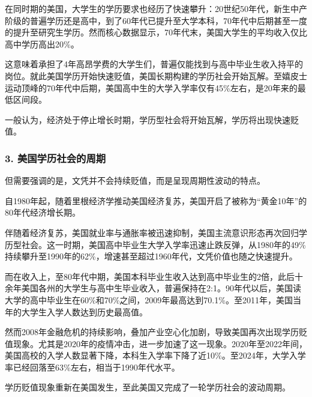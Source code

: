 {\fangsong 在同时期的美国，大学生的学历要求也经历了快速攀升：20世纪50年代，新生中产阶级的普遍学历还是高中，到了60年代已提升至大学本科，70年代中后期甚至一度的提升至研究生学历。然而核心数据显示，70年代末，美国大学生的平均收入仅比高中学历高出20\%。\par}

{\fangsong 这意味着承担了4年高昂学费的大学生们，普遍仅能找到与高中毕业生收入持平的岗位。就此美国学历开始快速贬值，美国长期构建的学历社会开始瓦解。至嬉皮士运动顶峰的70年代中后期，美国高中生的大学入学率仅有45\%左右，是20年来的最低区间段。\par}

{\fangsong 一般认为，经济处于停止增长时期，学历型社会将开始瓦解，学历将出现快速贬值。\par}

\subsubsection{3. 美国学历社会的周期}

{\fangsong 但需要强调的是，文凭并不会持续贬值，而是呈现周期性波动的特点。\par}

{\fangsong 自1980年起，随着里根经济学推动美国经济复苏，美国开启了被称为“黄金10年”的80年代经济增长期。\par}

{\fangsong 伴随着经济复苏，美国就业率与通胀率被迅速抑制，美国主流意识形态再次回归学历型社会。这一时期，美国高中毕业生大学入学率迅速止跌反弹，从1980年的49\%持续攀升至1990年的62\%，增速甚至超过1960年代，文凭价值也随之快速提升。\par}

{\fangsong 而在收入上，至80年代中期，美国本科毕业生收入达到高中毕业生的2倍，此后十余年美国各州的大学生与高中生毕业收入，普遍保持在2:1。90年代以后，美国读大学的高中毕业生在60\%和70\%之间，2009年最高达到70.1\%。至2011年，美国当年的大学生入学人数达到历史最高值。\par}

{\fangsong 然而2008年金融危机的持续影响，叠加产业空心化加剧，导致美国再次出现学历贬值现象。尤其是2020年的疫情冲击，进一步加速了这一现象。2020年至2022年间，美国高校的入学人数显著下降，本科生入学率下降了近10\%。至2024年，大学入学率已经回落至63\%左右，相当于1990年代水平。\par}

{\fangsong 学历贬值现象重新在美国发生，至此美国又完成了一轮学历社会的波动周期。\par}
